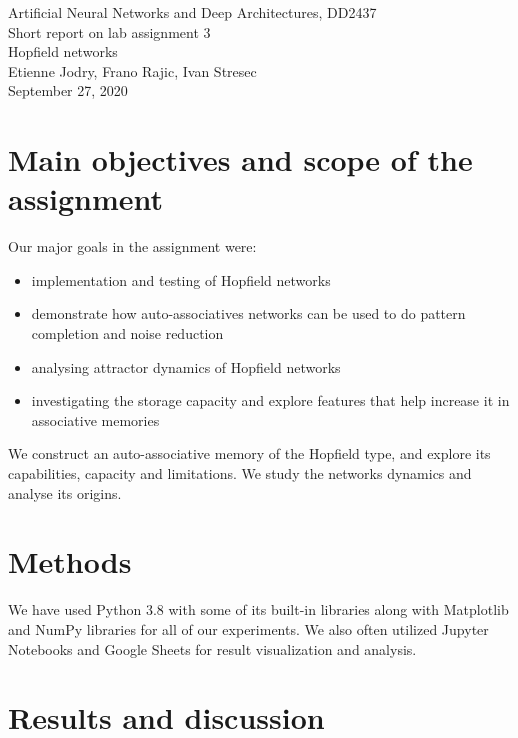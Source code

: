\documentclass[a4paper]{article}
\begin{document}
\begin{center}
  {\large Artificial Neural Networks and Deep Architectures, DD2437}\\
  \vspace{7mm}
  {\huge Short report on lab assignment 3\\[1ex]}
  {\Large Hopfield networks}\\
  \vspace{8mm}
  {\Large Etienne Jodry, Frano Rajic, Ivan Stresec\\}
  \vspace{4mm}
  {\large September 27, 2020\\}
\end{center}

\section{Main objectives and scope of the assignment}

Our major goals in the assignment were:
\begin{itemize}
\item implementation and testing of Hopfield networks
\item demonstrate how auto-associatives networks can be used to do pattern completion and noise reduction
\item analysing attractor dynamics of Hopfield networks
\item investigating the storage capacity and explore features that help increase it in associative memories
\end{itemize}

We construct an auto-associative memory of the Hopfield type, and explore its capabilities, capacity and limitations. We study the networks dynamics and analyse its origins.

\section{Methods}

We have used Python 3.8 with some of its built-in libraries along with Matplotlib and NumPy libraries for all of our experiments. We also often utilized Jupyter Notebooks and Google Sheets for result visualization and analysis.

\section{Results and discussion}
\end{document}
